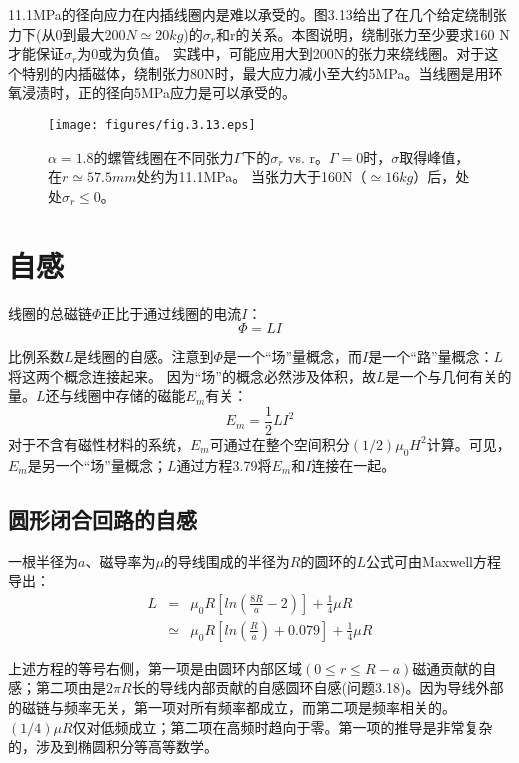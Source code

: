 11.1MPa的径向应力在内插线圈内是难以承受的。图3.13给出了在几个给定绕制张力下(从0到最大$200 N\simeq 20 kg$)的$\sigma_{r}$和r的关系。本图说明，绕制张力至少要求160 N才能保证$\sigma_{r}$为0或为负值。
实践中，可能应用大到200N的张力来绕线圈。对于这个特别的内插磁体，绕制张力80N时，最大应力减小至大约5MPa。当线圈是用环氧浸渍时，正的径向5MPa应力是可以承受的。
\begin{figure}[htbp]
  \centering
 \texttt{[image: figures/fig.3.13.eps]}
  \caption{$\alpha=1.8$的螺管线圈在不同张力$\Gamma$下的$\sigma_r$ vs. r。$\Gamma=0$时，$\sigma$取得峰值，在$r\simeq 57.5 mm$处约为11.1MPa。
  当张力大于160N（$\simeq 16 kg$）后，处处$\sigma_r\le 0 $。}
\end{figure}




\section{自感}
线圈的总磁链$\Phi$正比于通过线圈的电流$I$：
\begin{equation}
 \Phi=LI %
\end{equation}

比例系数$L$是线圈的自感。注意到$\Phi$是一个“场”量概念，而$I$是一个“路”量概念：$L$将这两个概念连接起来。
因为“场”的概念必然涉及体积，故$L$是一个与几何有关的量。$L$还与线圈中存储的磁能$E_m$有关：
\begin{equation}
 E_m=\frac{1}{2}LI^2 %
\end{equation}
对于不含有磁性材料的系统，$E_m$可通过在整个空间积分$(1/2)\mu_0 H^2$计算。可见，$E_m$是另一个“场”量概念；$L$通过方程3.79将$E_m$和$I$连接在一起。

\subsection{圆形闭合回路的自感}
一根半径为$a$、磁导率为$\mu$的导线围成的半径为$R$的圆环的$L$公式可由Maxwell方程导出：
\begin{eqnarray}
L&=&\mu_0R[ln(\frac{8R}{a}-2)]+\frac{1}{4}\mu R \\
&\simeq & \mu_0R[ln(\frac{R}{a})+0.079]+\frac{1}{4}\mu R%
\end{eqnarray}

上述方程的等号右侧，第一项是由圆环内部区域$(0\le r \le R-a)$磁通贡献的自感；第二项由是$2\pi R$长的导线内部贡献的自感圆环自感(问题3.18)。因为导线外部的磁链与频率无关，第一项对所有频率都成立，而第二项是频率相关的。$(1/4)\mu R$仅对低频成立；第二项在高频时趋向于零。第一项的推导是非常复杂的，涉及到椭圆积分等高等数学。

